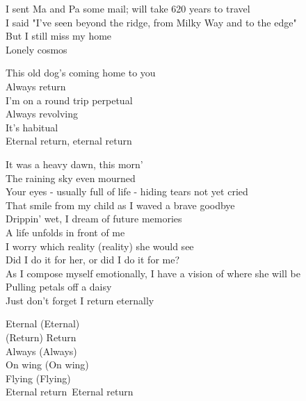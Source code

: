 
I sent Ma and Pa some mail; will take 620 years to travel\\
I said "I've seen beyond the ridge, from Milky Way and to the edge"\\
But I still miss my home\\
Lonely cosmos\\




This old dog's coming home to you\\
Always return\\
I'm on a round trip perpetual\\
Always revolving\\
It's habitual\\
Eternal return, eternal return\\


It was a heavy dawn, this morn'\\
The raining sky even mourned\\
Your eyes - usually full of life - hiding tears not yet cried\\
That smile from my child as I waved a brave goodbye\\
Drippin' wet, I dream of future memories\\
A life unfolds in front of me\\

I worry which reality (reality) she would see\\
Did I do it for her, or did I do it for me?\\
As I compose myself emotionally, I have a vision of where she will be\\
Pulling petals off a daisy\\
Just don't forget I return eternally\\


Eternal (Eternal)\\
(Return) Return\\
Always (Always)\\
On wing (On wing)\\
Flying (Flying)\\
Eternal return\
Eternal return\\

